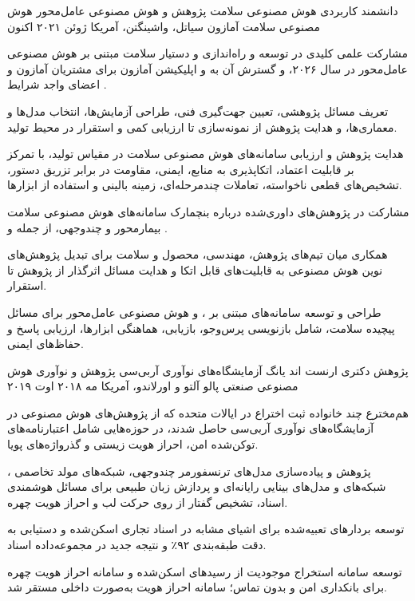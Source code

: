 
\begin{cventries}

\cventry
{دانشمند کاربردی  هوش مصنوعی سلامت  پژوهش و هوش مصنوعی عامل‌محور}
{هوش مصنوعی سلامت آمازون}
{سیاتل، واشینگتن، آمریکا}
{ژوئن ۲۰۲۱  اکنون}
{
\begin{cvitems}
\item {مشارکت علمی کلیدی در توسعه و راه‌اندازی  و دستیار سلامت مبتنی بر هوش مصنوعی عامل‌محور  در سال ۲۰۲۶، و گسترش آن به  و اپلیکیشن آمازون برای مشتریان آمازون و اعضای واجد شرایط .}
\item {تعریف مسائل پژوهشی، تعیین جهت‌گیری فنی، طراحی آزمایش‌ها، انتخاب مدل‌ها و معماری‌ها، و هدایت پژوهش از نمونه‌سازی تا ارزیابی کمی و استقرار در محیط تولید.}
\item {هدایت پژوهش و ارزیابی سامانه‌های هوش مصنوعی سلامت در مقیاس تولید، با تمرکز بر قابلیت اعتماد، اتکاپذیری به منابع، ایمنی، مقاومت در برابر تزریق دستور، تشخیص‌های قطعی ناخواسته، تعاملات چندمرحله‌ای، زمینه بالینی و استفاده از ابزارها.}
\item {مشارکت در پژوهش‌های داوری‌شده درباره بنچمارک سامانه‌های هوش مصنوعی سلامت بیمارمحور و چندوجهی، از جمله  و .}
\item {همکاری میان تیم‌های پژوهش، مهندسی، محصول و سلامت برای تبدیل پژوهش‌های نوین هوش مصنوعی به قابلیت‌های قابل اتکا و هدایت مسائل اثرگذار از پژوهش تا استقرار.}
\item {طراحی و توسعه سامانه‌های مبتنی بر ،  و هوش مصنوعی عامل‌محور برای مسائل پیچیده سلامت، شامل بازنویسی پرس‌وجو، بازیابی، هماهنگی ابزارها، ارزیابی پاسخ و حفاظ‌های ایمنی.}
\end{cvitems}
}

\cventry
{پژوهش دکتری  ارنست اند یانگ \lr{/} آزمایشگاه‌های نوآوری آر‌بی‌سی}
{پژوهش و نوآوری هوش مصنوعی صنعتی}
{پالو آلتو و اورلاندو، آمریکا}
{مه ۲۰۱۸  اوت ۲۰۱۹}
{
\begin{cvitems}
\item {هم‌مخترع چند خانواده ثبت اختراع در ایالات متحده که از پژوهش‌های هوش مصنوعی در آزمایشگاه‌های نوآوری آر‌بی‌سی حاصل شدند، در حوزه‌هایی شامل اعتبارنامه‌های توکن‌شده امن، احراز هویت زیستی و گذرواژه‌های پویا.}
\item {پژوهش و پیاده‌سازی مدل‌های ترنسفورمر چندوجهی، شبکه‌های مولد تخاصمی ، شبکه‌های  و مدل‌های بینایی رایانه‌ای و پردازش زبان طبیعی برای مسائل هوشمندی اسناد، تشخیص گفتار از روی حرکت لب و احراز هویت چهره.}
\item {توسعه بردارهای تعبیه‌شده برای اشیای مشابه در اسناد تجاری اسکن‌شده و دستیابی به دقت طبقه‌بندی ۹۲٪ و نتیجه جدید  در مجموعه‌داده اسناد.}
\item {توسعه سامانه استخراج موجودیت از رسیدهای اسکن‌شده و سامانه احراز هویت چهره برای بانکداری امن و بدون تماس؛ سامانه احراز هویت به‌صورت داخلی مستقر شد.}
\end{cvitems}
}


\end{cventries}
